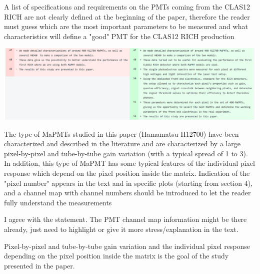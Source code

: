 \documentclass[11pt]{report}
\begin{document}
\begin{tcolorbox}[enlarge top by=2em,colbacktitle=black!60!white,colframe=black!80!white,left=0pt,right=0pt,top=0pt,bottom=0pt,boxrule=0.3pt,title=\bfseries2.02]
A list of specifications and requirements on the PMTs coming from the CLAS12 RICH are not clearly defined at the beginning of the paper, therefore the reader must guess which are the most important parameters to be measured and what characteristics will define a "good" PMT for the CLAS12 RICH production
\end{tcolorbox}


\includegraphics[width=\linewidth]{round1/2.02.png}


\begin{tcolorbox}[enlarge top by=2em,colbacktitle=red!60!white,colframe=black!80!white,left=0pt,right=0pt,top=0pt,bottom=0pt,boxrule=0.3pt,title=\bfseries2.03]
The type of MaPMTs studied in this paper (Hamamatsu H12700) have been characterized and described in the literature and are characterized by a large pixel-by-pixel and tube-by-tube gain variation (with a typical spread of 1 to 3). In addition, this type of MaPMT has some typical features of the individual pixel response which depend on the pixel position inside the matrix. Indication of the "pixel number" appears in the text and in specific plots (starting from section 4), and a channel map with channel numbers should be introduced to let the reader fully understand the measurements
\end{tcolorbox}

{\centering
\begin{tcolorbox}[enlarge top by=2em,colbacktitle=green!60!white,colframe=black!80!white,width=0.9\linewidth,left=30pt,right=30pt,top=10pt,bottom=10pt,boxrule=0.3pt,title=\bfseries our draft remarks]
I agree with the statement. The PMT channel map information might be there already, just need to highlight or give it more stress/explanation in the text.

Pixel-by-pixel and tube-by-tube gain variation and the individual pixel response 
depending on the pixel position inside the matrix is the goal of the study presented in the paper.

\end{tcolorbox}
}
\end{document}
